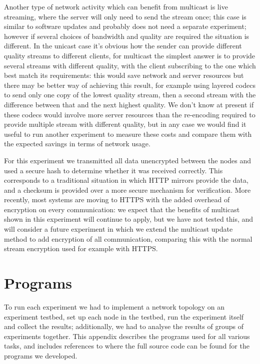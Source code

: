 \documentclass[a4paper,11pt,twocolumn]{article}
\begin{document}
Another type of network activity which can benefit from multicast is
live streaming, where the server will only need to send the stream once;
this case is similar to software updates and probably does not need a
separate experiment; however if several choices of bandwidth and quality
are required the situation is different.  In the unicast case it's obvious
how the sender can provide different quality streams to different clients,
for multicast the simplest answer is to provide several streams with
different quality, with the client subscribing to the one which best
match its requirements: this would save network and server resources
but there may be better way of achieving this result, for example using
layered codecs to send only one copy of the lowest quality stream, then
a second stream with the difference between that and the next highest
quality. We don't know at present if these codecs would involve more
server resources than the re-encoding required to provide multiple
stream with different quality, but in any case we would find it useful
to run another experiment to measure these costs and compare them with
the expected savings in terms of network usage.

For this experiment we transmitted all data unencrypted between the nodes
and used a secure hash to determine whether it was received correctly.
This corresponds to a traditional situation in which HTTP mirrors provide
the data, and a checksum is provided over a more secure mechanism for
verification.  More recently, most systems are moving to HTTPS with the
added overhead of encryption on every communication: we expect that the
benefits of multicast shown in this experiment will continue to apply,
but we have not tested this, and will consider a future experiment in
which we extend the multicast update method to add encryption of all
communication, comparing this with the normal stream encryption used
for example with HTTPS.

\appendix
\section{Programs}
\label{programs}

To run each experiment we had to implement a network topology on an
experiment testbed, set up each node in the testbed, run the experiment
itself and collect the results; additionally, we had to analyse the
results of groups of experiments together.  This appendix describes
the programs used for all various tasks, and includes references to
where the full source code can be found for the programs we developed.
\end{document}
